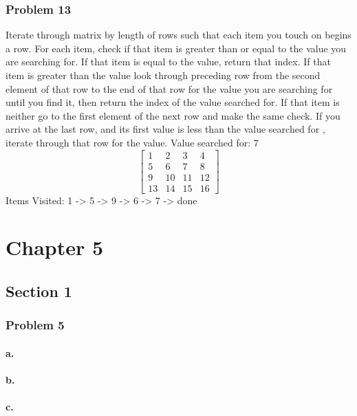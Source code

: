\documentclass{article}
\begin{document}
        \subsubsection{Problem 13}
        Iterate through matrix by length of rows such that each item you touch on
        begins a row. For each item, check if that item is greater than or equal to the value you are
        searching for. If that item is equal to the value, return that index. If that item is greater than the value look through preceding row from the
        second element of that row to the end of that row for the value you are searching for until you find it,
        then return the index of the value searched for.
        If that item is neither go to the first element of the next row and make the same check.
        If you arrive at the last row, and its first value is less than the value searched for
        , iterate through that row for the value.
        \newline
        Value searched for: 7
        \[
        \begin{bmatrix}
        1 & 2 & 3 & 4 \\
        5 & 6 & 7 & 8 \\
        9 & 10 & 11 & 12 \\
        13 & 14 & 15 & 16
        \end{bmatrix}
        \]
        Items Visited: 1 -> 5 -> 9 -> 6 -> 7 -> done

    \section{Chapter 5}
      \subsection{Section 1}
        \subsubsection{Problem 5}
          \paragraph{a.}
          \paragraph{b.}
          \paragraph{c.}
\end{document}
